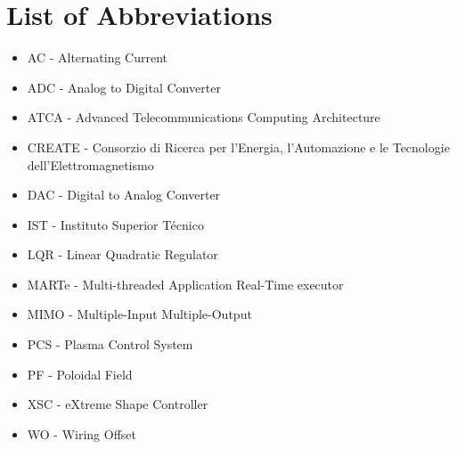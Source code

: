 \chapter*{List of Abbreviations}

\begin{itemize}
\item AC - Alternating Current
\item ADC - Analog to Digital Converter
\item ATCA -  Advanced Telecommunications Computing Architecture 
\item CREATE - Consorzio di Ricerca per l'Energia, l'Automazione e le Tecnologie dell'Elettromagnetismo
\item DAC - Digital to Analog Converter
\item IST - Instituto Superior Técnico 
\item LQR - Linear Quadratic Regulator
\item MARTe - Multi-threaded Application Real-Time executor
\item MIMO - Multiple-Input Multiple-Output
\item PCS - Plasma Control System
\item PF - Poloidal Field 
\item XSC - eXtreme Shape Controller
\item WO - Wiring Offset
\end{itemize}


